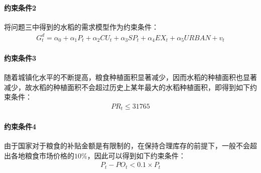 \documentclass[withoutpreface,bwprint]{cumcmthesis} %
\begin{document}
\paragraph{约束条件2}
将问题三中得到的水稻的需求模型作为约束条件：
\begin{gather}
G_{t}^{d}=\alpha_{0}+\alpha_{1}P_{t}+\alpha_{2}CU_{t}+\alpha_{3}S P_{t}+\alpha_{4}EX_{t}+\alpha_{5}URBAN+v_{t}
\end{gather}
\paragraph{约束条件3}
随着城镇化水平的不断提高，粮食种植面积显著减少，因而水稻的种植面积也显著减少，故水稻的种植面积不会超过历史上某年最大的水稻种植面积，即得到如下约束条件：
\begin{gather}
PR_t\leq31765
\end{gather}
\paragraph{约束条件4}
由于国家对于粮食的补贴金额是有限制的，在保持合理库存的前提下，一般不会超
出各地粮食市场价格的$10\%$，因此可以得到如下约束条件：
\begin{gather}
P_t-PO_t<0.1\times P_t
\end{gather}
\end{document}
